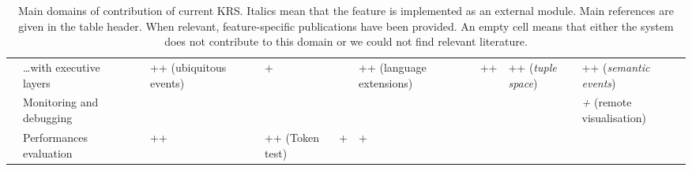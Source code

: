 \begin{landscape}
\begin{table}
\begin{center}
\begin{tabular}{p{0.2cm}p{3.4cm}p{1.6cm}p{1.3cm}p{1.5cm}p{1.7cm}p{1.5cm}p{2cm}p{1.4cm}p{1.4cm}p{1.4cm}|p{1.4cm}}
                                                      & \ldots with executive layers &                           & ++ (ubiquitous events)      &                             & +                           &                             & ++ (language extensions) \cite{Beetz2010} &                          & ++                            & ++ (\emph{tuple space})       & ++ (\emph{semantic events})                   \\
                                                          & Monitoring and debugging &                           &                             &                             &                             &                             &                                    &                                 &                               &                               & {\it+} (remote visualisation)                 \\
                                                           & Performances evaluation &                           & ++ \cite{Hawes2008}         &                             & ++ (Token test)             & +                           & + \cite{Tenorth2011}               &                                 &                               &                               &                                               \\

\bottomrule

\end{tabular}
\end{center}

\caption{Main domains of contribution of current KRS. Italics mean that the
feature is implemented as an external module. Main references are given in the
table header. When relevant, feature-specific publications have been provided.
An empty cell means that either the system does not contribute to this domain
or we could not find relevant literature.}

\label{table|contribution-by-systems}
\end{table}
\end{landscape}

